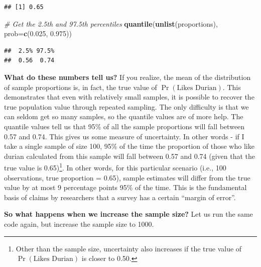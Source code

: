 \documentclass[
  openany]{book}
\newenvironment{Shaded}{\begin{snugshade}}{\end{snugshade}}
\newcommand{\CommentTok}[1]{\textcolor[rgb]{0.56,0.35,0.01}{\textit{#1}}}
\newcommand{\DataTypeTok}[1]{\textcolor[rgb]{0.13,0.29,0.53}{#1}}
\newcommand{\FloatTok}[1]{\textcolor[rgb]{0.00,0.00,0.81}{#1}}
\newcommand{\KeywordTok}[1]{\textcolor[rgb]{0.13,0.29,0.53}{\textbf{#1}}}
\newcommand{\NormalTok}[1]{#1}
\begin{document}
\begin{verbatim}
## [1] 0.65
\end{verbatim}

\begin{Shaded}
\begin{Highlighting}[]
\CommentTok{# Get the 2.5th and 97.5th percentiles}
\KeywordTok{quantile}\NormalTok{(}\KeywordTok{unlist}\NormalTok{(proportions), }\DataTypeTok{prob=}\KeywordTok{c}\NormalTok{(}\FloatTok{0.025}\NormalTok{, }\FloatTok{0.975}\NormalTok{))}
\end{Highlighting}
\end{Shaded}

\begin{verbatim}
##  2.5% 97.5% 
##  0.56  0.74
\end{verbatim}

\textbf{What do these numbers tell us?} If you realize, the mean of the distribution of sample proportions is, in fact, the true value of \(\Pr(\text{Likes Durian})\). This demonstrates that even with relatively small samples, it is possible to recover the true population value through repeated sampling. The only difficulty is that we can seldom get so many samples, so the quantile values are of more help. The quantile values tell us that 95\% of all the sample proportions will fall between 0.57 and 0.74. This gives us some measure of uncertainty. In other words - if I take a single sample of size 100, 95\% of the time the proportion of those who like durian calculated from this sample will fall between 0.57 and 0.74 (given that the true value is 0.65)\footnote{Other than the sample size, uncertainty also increases if the true value of \(\Pr(\text{Likes Durian})\) is closer to 0.50.}. In other words, for this particular scenario (i.e., 100 observations, true proportion = 0.65), sample estimates will differ from the true value by at most 9 percentage points 95\% of the time. This is the fundamental basis of claims by researchers that a survey has a certain ``margin of error''.

\textbf{So what happens when we increase the sample size?} Let us run the same code again, but increase the sample size to 1000.
\end{document}
